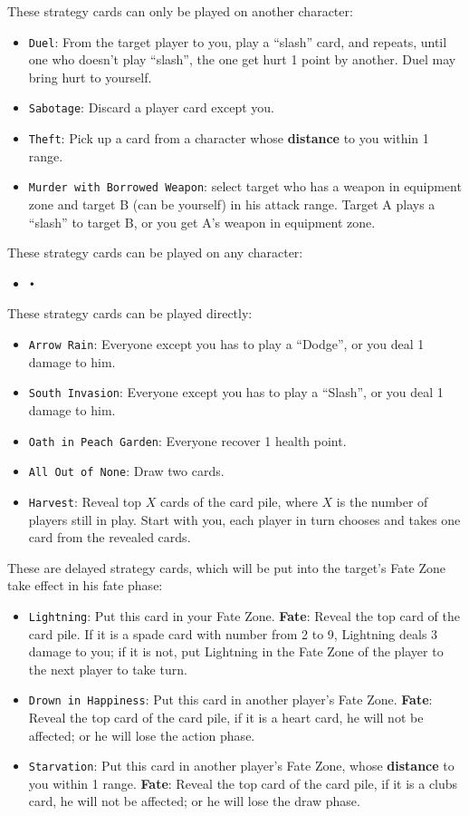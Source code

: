\documentclass[11pt,a4paper]{article}
\begin{document}
These strategy cards can only be played on another character:
\begin{itemize}
\item \texttt{Duel}: From the target player to you, play a ``slash'' card, and repeats, until one who doesn’t play ``slash'', the one get hurt 1 point by another. Duel may bring hurt to yourself.
\item \texttt{Sabotage}: Discard a player card except you.
\item \texttt{Theft}: Pick up a card from a character whose \textbf{distance} to you within 1 range.
\item \texttt{Murder with Borrowed Weapon}: select target who has a weapon in equipment zone and target B (can be yourself) in his attack range. Target A plays a ``slash'' to target B, or you get A’s weapon in equipment zone.
\end{itemize}

These strategy cards can be played on any character:
\begin{itemize}
\item \texttt{•}
\end{itemize}

These strategy cards can be played directly:
\begin{itemize}
\item \texttt{Arrow Rain}: Everyone except you has to play a ``Dodge'', or you deal 1 damage to him.
\item \texttt{South Invasion}: Everyone except you has to play a ``Slash'', or you deal 1 damage to him.
\item \texttt{Oath in Peach Garden}: Everyone recover 1 health point.
\item \texttt{All Out of None}: Draw two cards.
\item \texttt{Harvest}: Reveal top $X$ cards of the card pile, where $X$ is the number of players still in play. Start with you, each player in turn chooses and takes one card from the revealed cards.
\end{itemize} 

These are delayed strategy cards, which will be put into the target's Fate Zone take effect in his fate phase:
\begin{itemize}
\item \texttt{Lightning}: Put this card in your Fate Zone. \textbf{Fate}: Reveal the top card of the card pile. If it is a spade card with number from 2 to 9, Lightning deals 3 damage to you; if it is not, put Lightning in the Fate Zone of the player to the next player to take turn.
\item \texttt{Drown in Happiness}: Put this card in another player's Fate Zone. \textbf{Fate}: Reveal the top card of the card pile, if it is a heart card, he will not be affected; or he will lose the action phase.
\item \texttt{Starvation}: Put this card in another player's Fate Zone, whose \textbf{distance} to you within 1 range. \textbf{Fate}: Reveal the top card of the card pile, if it is a clubs card, he will not be affected; or he will lose the draw phase.
\end{itemize}
\end{document}
